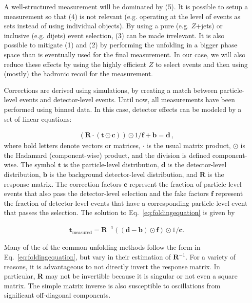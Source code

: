 \documentclass[NOTE, atlasdraft=true, texlive=2016, UKenglish]{\ATLASLATEXPATH atlasdoc}
\begin{document}
A well-structured measurement will be dominated by (5).  It is possible to setup a measurement so that (4) is not relevant (e.g. operating at the level of events as sets instead of using individual objects).  By using a pure (e.g. $Z$+jets) or inclusive (e.g. dijets) event selection, (3) can be made irrelevant.  It is also possible to mitigate (1) and (2) by performing the unfolding in a bigger phase space than is eventually used for the final measurement.  In our case, we will also reduce these effects by using the highly efficient $Z$ to select events and then using (mostly) the hadronic recoil for the measurement.

Corrections are derived using simulations, by creating a match between particle-level events and detector-level events.  Until now, all measurements have been performed using binned data.   In this case, detector effects can be modeled by a set of linear equations:

\begin{align}
\label{eq:foldingequation}
\left(\textbf{R}\cdot (\textbf{t}\odot \textbf{c})\right)\odot 1/\textbf{f}+\textbf{b}=\textbf{d}\,,
\end{align}
%
where bold letters denote vectors or matrices, $\cdot$ is the usual matrix product, $\odot$ is the Hadamard (component-wise) product, and the division is defined component-wise. The symbol $\textbf{t}$ is the particle-level distribution, $\textbf{d}$ is the detector-level distribution, $\textbf{b}$ is the background detector-level distribution, and $\textbf{R}$ is the response matrix.  The correction factors $\textbf{c}$ represent the fraction of particle-level events that also pass the detector-level selection and the fake factors $\textbf{f}$ represent the fraction of detector-level events that have a corresponding particle-level event that passes the selection.  The solution to Eq.~\ref{eq:foldingequation} is given by

\begin{align}
\label{eq:foldingequation}
\textbf{t}_\text{measured} = \textbf{R}^{-1}\left( (\textbf{d}-\textbf{b})\odot \textbf{f}\right)\odot 1/\textbf{c}.
\end{align}

Many of the of the common unfolding methods follow the form in Eq.~\ref{eq:foldingequation}, but vary in their estimation of $\textbf{R}^{-1}$.  For a variety of reasons, it is advantageous to not directly invert the response matrix.  In particular, \textbf{R} may not be invertible because it is singular or not even a square matrix.  The simple matrix inverse is also susceptible to oscillations from significant off-diagonal components.
\end{document}

